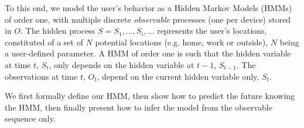 To this end, we model the user's behavior as a Hidden Markov Models (HMMs) of order one, with multiple discrete \emph{observable} processes (one per device) stored in $O$. 
The hidden process $S=S_1, ..., S_i, ...$ represents the user's locations, constituted of a set of $N$ potential locations (e.g. home, work or outside), $N$ being a user-defined parameter.
A HMM of order one is such that the hidden variable at time $t$, $S_t$, only depends on the hidden variable at $t-1$, $S_{t-1}$.
The observations at time $t$, $O_t$, depend on the current hidden variable only, $S_t$.

We first formally define our HMM, then show how to predict the future knowing the HMM, then finally present how to infer the model from the observable sequence only.






